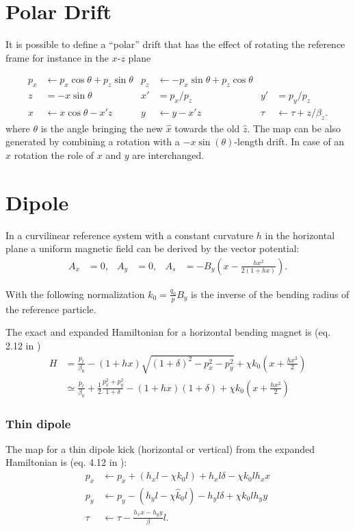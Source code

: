 \documentclass[english]{article}
\begin{document}
\section{Polar Drift}
It is possible to define a ``polar'' drift that has the effect of rotating the reference frame
\cite{forest99} for instance in the $x$-$z$ plane

\begin{align}
p_x & \leftarrow   p_x \cos \theta + p_z \sin\theta &
p_z & \leftarrow - p_x \sin \theta + p_z \cos\theta \\
z   &= -x \sin \theta & x' &= p_x/p_z &  y' &= p_y/p_z \\
x   & \leftarrow x \cos\theta - x' z  &
y   & \leftarrow y - x' z  & \tau & \leftarrow \tau + z/\beta_z .
\end{align}
where $\theta$ is the angle bringing the new $\hat x$ towards the old $\hat z$.
The map can be also generated by combining a rotation with a $-x
\sin(\theta)$-length drift. In case of an $\hat x$ rotation the role of $x$ and $y$ are interchanged. 


\section{Dipole}

In a curvilinear reference system with a constant curvature $h$ in the
horizontal plane a uniform magnetic field can be derived by the vector potential:
\begin{align}
  A_x & = 0, & A_y & = 0, & A_s & = 
  - B_y \left(x-\frac{h x^2}{2 (1+h x)}\right).
\end{align}

With the following normalization $k_0=\frac{q_0}{p} B_y$ is the inverse of the bending 
radius of the reference particle.

The exact and expanded Hamiltonian for a horizontal bending magnet is (eq. 2.12 in
\cite{barber87})
\begin{align}
  H &= \frac{p_t}{\beta_0} 
       - (1+h x)\sqrt{(1+\delta)^2 -p_x^2 - p_y^2}
       + \chi k_0 \left( x + \frac{h x^2}{2} \right)  \\
    &\simeq   \frac{p_t}{\beta_0}
    + \frac{1}{2}\frac{p_x^2+p_y^2}{1+\delta}
  - (1+h x) (1+\delta) + \chi k_0 \left( x + \frac{h x^2}{2} \right)
\end{align}


\subsubsection{Thin dipole}
The map for a thin dipole kick (horizontal or vertical) from the expanded Hamiltonian is 
(eq. 4.12 in \cite{heinemann95}):
\begin{align}
  p_x &\leftarrow p_x + (h_x l - \chi k_0 l)  + h_x l \delta - \chi k_0 l h_x x \\
  p_y &\leftarrow p_y - (h_y l - \chi \hat k_0 l) - h_y l \delta + \chi k_0 l h_y y\\
  \tau &\leftarrow \tau - \frac{h_xx - h_yy}{\beta}  l.
\end{align}
\end{document}
